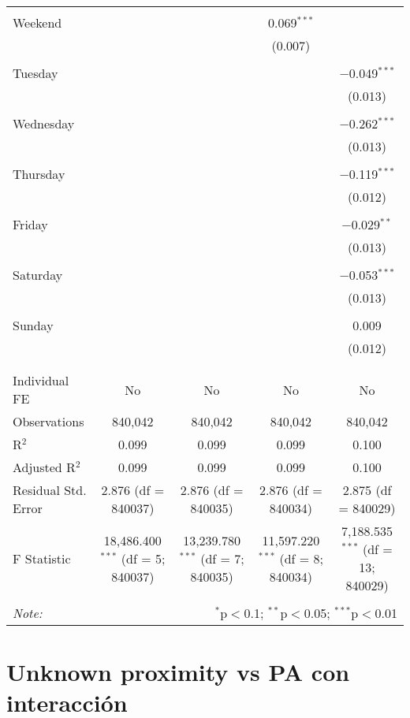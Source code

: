 \documentclass[
]{article}
\begin{document}
\begin{table}[!htbp]
{\begin{tabular}{@{\extracolsep{5pt}}lcccc}
  & & & & \\ 
 Weekend &  &  & 0.069$^{***}$ &  \\ 
  &  &  & (0.007) &  \\ 
  & & & & \\ 
 Tuesday &  &  &  & $-$0.049$^{***}$ \\ 
  &  &  &  & (0.013) \\ 
  & & & & \\ 
 Wednesday &  &  &  & $-$0.262$^{***}$ \\ 
  &  &  &  & (0.013) \\ 
  & & & & \\ 
 Thursday &  &  &  & $-$0.119$^{***}$ \\ 
  &  &  &  & (0.012) \\ 
  & & & & \\ 
 Friday &  &  &  & $-$0.029$^{**}$ \\ 
  &  &  &  & (0.013) \\ 
  & & & & \\ 
 Saturday &  &  &  & $-$0.053$^{***}$ \\ 
  &  &  &  & (0.013) \\ 
  & & & & \\ 
 Sunday &  &  &  & 0.009 \\ 
  &  &  &  & (0.012) \\ 
  & & & & \\ 
\hline \\[-1.8ex] 
Individual FE & No & No & No & No \\ 
Observations & 840,042 & 840,042 & 840,042 & 840,042 \\ 
R$^{2}$ & 0.099 & 0.099 & 0.099 & 0.100 \\ 
Adjusted R$^{2}$ & 0.099 & 0.099 & 0.099 & 0.100 \\ 
Residual Std. Error & 2.876 (df = 840037) & 2.876 (df = 840035) & 2.876 (df = 840034) & 2.875 (df = 840029) \\ 
F Statistic & 18,486.400$^{***}$ (df = 5; 840037) & 13,239.780$^{***}$ (df = 7; 840035) & 11,597.220$^{***}$ (df = 8; 840034) & 7,188.535$^{***}$ (df = 13; 840029) \\ 
\hline 
\hline \\[-1.8ex] 
\textit{Note:}  & \multicolumn{4}{r}{$^{*}$p$<$0.1; $^{**}$p$<$0.05; $^{***}$p$<$0.01} \\ 
\end{tabular}
} 
\end{table} 
\newpage
\section{Unknown proximity vs PA con interacción}
\end{document}
